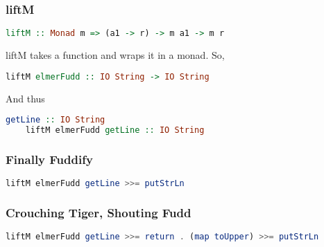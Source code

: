 \documentclass[presentation.tex]{subfiles}
\begin{document}
\begin{frame}[fragile]
  \frametitle{liftM}

  \begin{lstlisting}[frame=single,language=Haskell,breaklines=true]
    liftM :: Monad m => (a1 -> r) -> m a1 -> m r
  \end{lstlisting}

  liftM takes a function and wraps it in a monad. So,

  \begin{lstlisting}[frame=single,language=Haskell,breaklines=true]
    liftM elmerFudd :: IO String -> IO String
  \end{lstlisting}

  And thus

  \begin{lstlisting}[frame=single,language=Haskell,breaklines=true]
    getLine :: IO String
    liftM elmerFudd getLine :: IO String
  \end{lstlisting}
\end{frame}

\begin{frame}[fragile]
  \frametitle{Finally Fuddify}

  \begin{lstlisting}[frame=single,language=Haskell,breaklines=true]
    liftM elmerFudd getLine >>= putStrLn
  \end{lstlisting}
\end{frame}


\begin{frame}[fragile]
  \frametitle{Crouching Tiger, Shouting Fudd}

  \begin{lstlisting}[frame=single,language=Haskell,breaklines=true]
    liftM elmerFudd getLine >>= return . (map toUpper) >>= putStrLn
  \end{lstlisting}
\end{frame}
\end{document}
